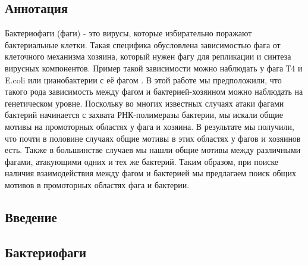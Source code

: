 \documentclass[14pt]{extarticle}
\begin{document}
%


\begin{center}
\item \section{Аннотация}
\end{center}

\par{Бактериофаги (фаги) - это вирусы, которые избирательно поражают бактериальные клетки. Такая специфика обусловлена
зависимостью фага от клеточного механизма хозяина, который нужен фагу для репликации и синтеза вирусных компонентов.
Пример такой зависимости можно наблюдать у фага Т4 и E.coli \cite{hinton} или цианобактерии с её фагом 
\cite{puxty-evanx}. В этой работе мы предположили, что такого рода зависимость между фагом и бактерией-хозяином можно 
наблюдать на генетическом уровне. Поскольку во многих известных случаях атаки фагами бактерий начинается с захвата 
РНК-полимеразы бактерии, мы искали общие мотивы на промоторных областях у фага и хозяина. В результате мы получили, что 
почти в половине случаях общие мотивы в этих областях у фагов и хозяинов есть. Также в большинстве случаев мы нашли 
общие мотивы между различными фагами, атакующими одних и тех же бактерий. Таким образом, при поиске наличия 
взаимодействия между фагом и бактерией мы предлагаем поиск общих мотивов в промоторных областях фага и бактерии.}


\newpage
\tableofcontents

\newpage
\begin{center}
\item \section{Введение}
\end{center}

    \begin{center}
    \item \subsection{Бактериофаги}
    \end{center}
    
\end{document}
